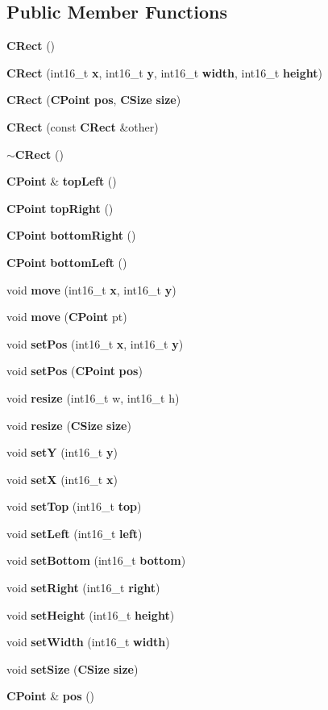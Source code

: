 \subsection*{Public Member Functions}
\begin{DoxyCompactItemize}
\item 
{\bf C\+Rect} ()
\item 
{\bf C\+Rect} (int16\+\_\+t {\bf x}, int16\+\_\+t {\bf y}, int16\+\_\+t {\bf width}, int16\+\_\+t {\bf height})
\item 
{\bf C\+Rect} ({\bf C\+Point} {\bf pos}, {\bf C\+Size} {\bf size})
\item 
{\bf C\+Rect} (const {\bf C\+Rect} \&other)
\item 
{\bf $\sim$\+C\+Rect} ()
\item 
{\bf C\+Point} \& {\bf top\+Left} ()
\item 
{\bf C\+Point} {\bf top\+Right} ()
\item 
{\bf C\+Point} {\bf bottom\+Right} ()
\item 
{\bf C\+Point} {\bf bottom\+Left} ()
\item 
void {\bf move} (int16\+\_\+t {\bf x}, int16\+\_\+t {\bf y})
\item 
void {\bf move} ({\bf C\+Point} pt)
\item 
void {\bf set\+Pos} (int16\+\_\+t {\bf x}, int16\+\_\+t {\bf y})
\item 
void {\bf set\+Pos} ({\bf C\+Point} {\bf pos})
\item 
void {\bf resize} (int16\+\_\+t w, int16\+\_\+t h)
\item 
void {\bf resize} ({\bf C\+Size} {\bf size})
\item 
void {\bf setY} (int16\+\_\+t {\bf y})
\item 
void {\bf setX} (int16\+\_\+t {\bf x})
\item 
void {\bf set\+Top} (int16\+\_\+t {\bf top})
\item 
void {\bf set\+Left} (int16\+\_\+t {\bf left})
\item 
void {\bf set\+Bottom} (int16\+\_\+t {\bf bottom})
\item 
void {\bf set\+Right} (int16\+\_\+t {\bf right})
\item 
void {\bf set\+Height} (int16\+\_\+t {\bf height})
\item 
void {\bf set\+Width} (int16\+\_\+t {\bf width})
\item 
void {\bf set\+Size} ({\bf C\+Size} {\bf size})
\item 
{\bf C\+Point} \& {\bf pos} ()

\end{DoxyCompactItemize}
